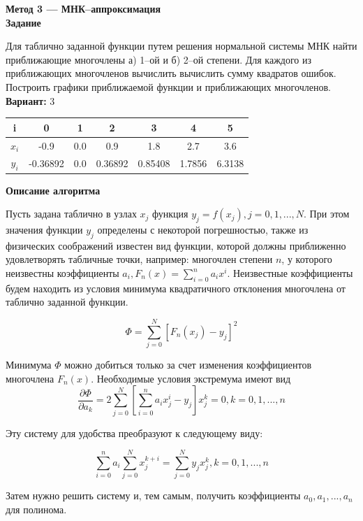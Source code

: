\textbf{Метод 3 --- МНК--аппроксимация}\\

\textbf{Задание}

Для таблично заданной функции путем решения нормальной системы МНК найти приближающие многочлены а) 1--ой и б) 2--ой степени. Для каждого из приближающих многочленов вычислить вычислить сумму квадратов ошибок. Построить графики приближаемой функции и приближающих многочленов.\\

\textbf{Вариант:} 3

\begin{tabular}{|c|c|c|c|c|c|c|}
\hline
i & 0 & 1 & 2 & 3 & 4 & 5\\
\hline
$x_i$ & -0.9 & 0.0 & 0.9 & 1.8 & 2.7 & 3.6 \\
\hline
$y_i$ & -0.36892 & 0.0 & 0.36892 & 0.85408 & 1.7856 & 6.3138 \\
\hline
\end{tabular}
\vspace{0.5cm}

\textbf{Описание алгоритма}

Пусть задана таблично в узлах $x_j$ функция $y_j=f(x_j), j=0,1,...,N$. При этом значения функции $y_j$ определены с некоторой погрешностью, также из физических соображений известен вид функции, которой должны приближенно удовлетворять табличные точки, например: многочлен степени $n$, у которого неизвестны коэффициенты $a_i, F_n(x)=\sum\limits_{i=0}^na_ix^i$. Неизвестные коэффициенты будем находить из условия минимума квадратичного отклонения многочлена от таблично заданной функции.

$$
\Phi=\sum\limits_{j=0}^N[F_n(x_j)-y_j]^2
$$

Минимума $\Phi$ можно добиться только за счет изменения коэффициентов многочлена $F_n(x)$. Необходимые условия экстремума имеют вид\\

$$
\frac{\partial \Phi}{\partial a_k}=2\sum\limits_{j=0}^N[\sum\limits_{i=0}^na_ix_j^i-y_j]x_j^k=0, k=0,1,...,n
$$

Эту систему для удобства преобразуют к следующему виду:

$$
\sum\limits_{i=0}^na_i\sum\limits_{j=0}^Nx_j^{k+i}=\sum\limits_{j=0}^Ny_jx_j^k, k=0,1,...,n
$$

Затем нужно решить систему и, тем самым, получить коэффициенты $a_0, a_1, ..., a_n$ для полинома.\\

